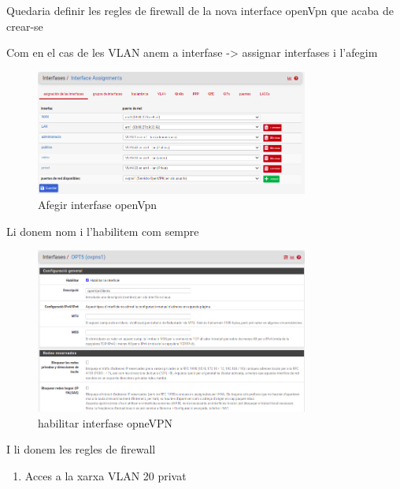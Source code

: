 \documentclass[
  10pt,
]{krantz}
\providecommand{\tightlist}{%
  \setlength{\itemsep}{0pt}\setlength{\parskip}{0pt}}
\begin{document}
Quedaria definir les regles de firewall de la nova interface openVpn que acaba de crear-se

Com en el cas de les VLAN anem a interfase -\textgreater{} assignar interfases i l'afegim

\begin{figure}
\centering
\includegraphics[width=0.8\textwidth,height=\textheight]{imatges/proxmox/interfase_vpn.png}
\caption{Afegir interfase openVpn}
\end{figure}

Li donem nom i l'habilitem com sempre

\begin{figure}
\centering
\includegraphics[width=0.8\textwidth,height=\textheight]{imatges/proxmox/habilitar_openVpn.png}
\caption{habilitar interfase opneVPN}
\end{figure}

I li donem les regles de firewall

\begin{enumerate}
\def\labelenumi{\arabic{enumi}.}
\tightlist
\item
  Acces a la xarxa VLAN 20 privat
\end{enumerate}
\end{document}
